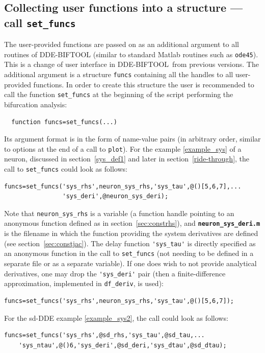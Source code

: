 \documentclass[10pt]{scrartcl}
\newcommand{\DDEBIFCODE}{\textsc{DDE-BIFTOOL}}
\newcommand{\file}[1]{\textbf{\texttt{#1}}}
\newcommand{\blist}[1]{\mbox{\lstinline!#1!}}
\begin{document}
\subsection{Collecting user functions into a structure --- call
  \blist{set_funcs}}
\label{sec:funcs}
The user-provided functions are passed on as an additional argument to
all routines of \DDEBIFCODE{} (similar to standard Matlab routines
such as \blist{ode45}). This is a change of user interface in
\DDEBIFCODE{}\,\version{} from previous versions. The additional
argument is a structure \blist{funcs} containing all the handles to
all user-provided functions. In order to create this structure the
user is recommended to call the function \blist{set_funcs} at the
beginning of the script performing the bifurcation analysis:
\begin{lstlisting}
  function funcs=set_funcs(...)
\end{lstlisting}
Its argument format is in the form of name-value pairs (in arbitrary
order, similar to options at the end of a call to \blist{plot}). For
the example \eqref{example_sys} of a neuron, discussed in
section~\ref{sys_def1} and later in section~\ref{ride-through}, the
call to \blist{set_funcs} could look as follows:
\begin{lstlisting}
funcs=set_funcs('sys_rhs',neuron_sys_rhs,'sys_tau',@()[5,6,7],...
                'sys_deri',@neuron_sys_deri);
\end{lstlisting}
Note that \blist{neuron_sys_rhs} is a variable (a function handle
pointing to an anonymous function defined as in
section~\ref{sec:constrhs}), and \file{neuron\_sys\_deri.m} is the
filename in which the function providing the system derivatives are
defined (see section~\ref{sec:constjac}). The delay function
\blist{'sys_tau'} is directly specified as an anonymous function in
the call to \blist{set_funcs} (not needing to be defined in a separate
file or as a separate variable). If one does wish to not provide
analytical derivatives, one may drop the \blist{'sys_deri'} pair (then
a finite-difference approximation, implemented in \blist{df_deriv}, is
used):
\begin{lstlisting}
funcs=set_funcs('sys_rhs',neuron_sys_rhs,'sys_tau',@()[5,6,7]);
\end{lstlisting}
For the sd-DDE example \eqref{example_sys2}, the call could look as follows:
\begin{lstlisting}
funcs=set_funcs('sys_rhs',@sd_rhs,'sys_tau',@sd_tau,...
    'sys_ntau',@()6,'sys_deri',@sd_deri,'sys_dtau',@sd_dtau);  
\end{lstlisting}
\end{document}
